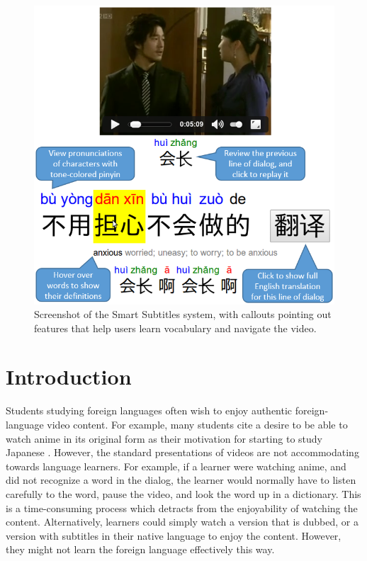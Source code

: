 \documentclass{sigchi}
\begin{document}
\begin{figure}[!h]
\centering
\includegraphics[width=\columnwidth]{smartsubs-features}
\caption{Screenshot of the Smart Subtitles system,
with callouts pointing out features that help users
learn vocabulary and navigate the video.}
\label{fig:figure1}
\end{figure}

\section{Introduction}

Students studying foreign languages often wish to enjoy authentic foreign-language video content. For example, many students cite a desire to be able to watch anime in its original form as their motivation for starting to study Japanese \cite{anime}. However, the standard presentations of videos are not accommodating towards language learners. For example, if a learner were watching anime, and did not recognize a word in the dialog, the learner would normally have
to listen carefully to the word, pause the video, and look the word up in a dictionary. This is a time-consuming process which detracts from the enjoyability of watching the content. Alternatively, learners could simply watch a version that is dubbed, or a version with subtitles in their native language to enjoy the content. However, they might not learn the foreign language effectively this way.
\end{document}

